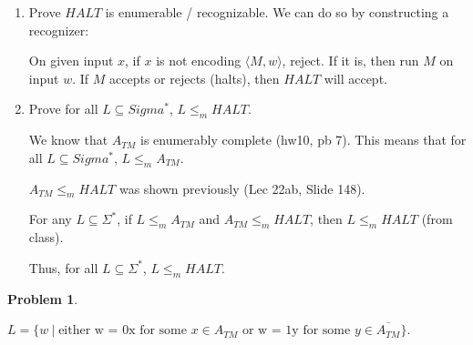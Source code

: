 \documentclass[11pt]{article}
\newcommand{\pipe}{\hspace{3pt}|\hspace{3pt}}
\theoremstyle{definition}
\theoremstyle{case}
\theoremstyle{theorem}
\newtheorem{prob}{Problem}
\begin{document}
\begin{enumerate}[label=(\arabic*)]

\item

Prove $HALT$ is enumerable / recognizable. We can do so by constructing a recognizer:

On given input $x$, if $x$ is not encoding $\langle M, w \rangle$, reject. If it is,
then run $M$ on input $w$. If $M$ accepts or rejects (halts), then $HALT$ will accept. 

\item

Prove for all $L \subseteq Sigma^*$, $L \leq_m HALT$.

We know that $A_{TM}$ is enumerably complete (hw10, pb 7). This means that for all $L \subseteq Sigma^*$, $L \leq_m A_{TM}$.

$A_{TM} \leq_m HALT$ was shown previously (Lec 22ab, Slide 148).

For any $L \subseteq \Sigma^*$, if $L \leq_m A_{TM}$ and $A_{TM} \leq_m HALT$, then $L \leq_m HALT$ (from class). 

Thus, for all $L \subseteq \Sigma^*$, $L \leq_m HALT$.

\end{enumerate}

\begin{prob}\end{prob}

$L = \{ w \pipe \text{either w = 0x for some } x \in A_{TM} \text{ or w = 1y for some } y \in \overline{A_{TM}}\}$.
\end{document}
